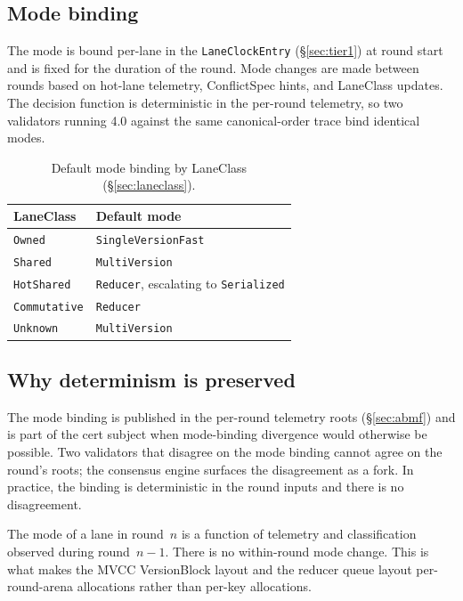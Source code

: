 \subsection{Mode binding}

The mode is bound per-lane in the \texttt{LaneClockEntry}
(\S\ref{sec:tier1}) at round start and is fixed for the duration of
the round. Mode changes are made between rounds based on hot-lane
telemetry, ConflictSpec hints, and LaneClass updates. The decision
function is deterministic in the per-round telemetry, so two validators
running 4.0 against the same canonical-order trace bind identical
modes.

\begin{table}[ht]
\centering
\small
\caption{Default mode binding by LaneClass (\S\ref{sec:laneclass}).}
\label{tab:mode-binding}
\begin{tabular}{ll}
\toprule
\textbf{LaneClass} & \textbf{Default mode} \\
\midrule
\texttt{Owned}        & \texttt{SingleVersionFast} \\
\texttt{Shared}       & \texttt{MultiVersion} \\
\texttt{HotShared}    & \texttt{Reducer}, escalating to \texttt{Serialized} \\
\texttt{Commutative}  & \texttt{Reducer} \\
\texttt{Unknown}      & \texttt{MultiVersion} \\
\bottomrule
\end{tabular}
\end{table}

\subsection{Why determinism is preserved}

The mode binding is published in the per-round telemetry roots
(\S\ref{sec:abmf}) and is part of the cert subject when mode-binding
divergence would otherwise be possible. Two validators that disagree
on the mode binding cannot agree on the round's roots; the consensus
engine surfaces the disagreement as a fork. In practice, the binding
is deterministic in the round inputs and there is no disagreement.

\begin{remark}
The mode of a lane in round~$n$ is a function of telemetry and
classification observed during round~$n-1$. There is no within-round
mode change. This is what makes the MVCC VersionBlock layout and the
reducer queue layout per-round-arena allocations rather than per-key
allocations.
\end{remark}

